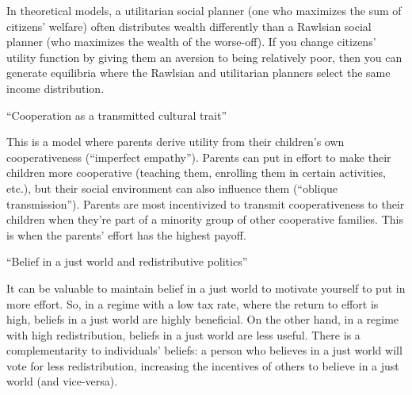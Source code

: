\documentclass{article}
\begin{document}
In theoretical models, a utilitarian social planner (one who maximizes the sum of citizens' welfare) often distributes wealth differently than a Rawlsian social planner (who maximizes the wealth of the worse-off). If you change citizens' utility function by giving them an aversion to being relatively poor, then you can generate equilibria where the Rawlsian and utilitarian planners select the same income distribution.

\medskip \noindent \textbf{\cite{bisin2004cooperation}} ``Cooperation as a transmitted cultural trait''

This is a model where parents derive utility from their children’s own cooperativeness (``imperfect empathy''). Parents can put in effort to make their children more cooperative (teaching them, enrolling them in certain activities, etc.), but their social environment can also influence them (``oblique transmission''). Parents are most incentivized to transmit cooperativeness to their children when they’re part of a minority group of other cooperative families. This is when the parents’ effort has the highest payoff.




\medskip \noindent \textbf{\cite{benabou2006belief}} ``Belief in a just world and redistributive politics''

It can be valuable to maintain belief in a just world to motivate yourself to put in more effort. So, in a regime with a low tax rate, where the return to effort is high, beliefs in a just world are highly beneficial. On the other hand, in a regime with high redistribution, beliefs in a just world are less useful. There is a complementarity to individuals’ beliefs: a person who believes in a just world will vote for less redistribution, increasing the incentives of others to believe in a just world (and vice-versa).
\end{document}
